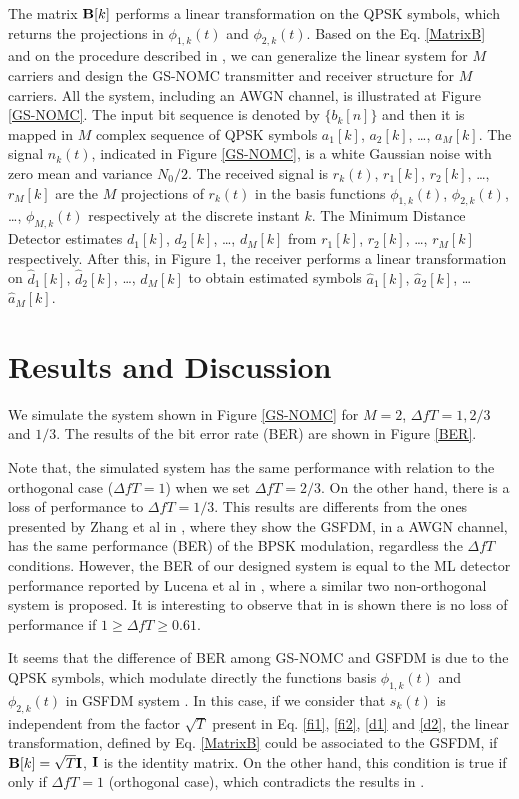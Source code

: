 \documentclass[draftcls,12pt, onecolumn, twoside]{IEEEtran}
\begin{document}
The matrix $\bold{B}[k]$ performs a linear transformation on the QPSK symbols, which returns the projections in $\phi_{1,k}(t)$ and $\phi_{2,k}(t)$. Based on the Eq. \ref{MatrixB} and on the procedure described in \cite{Zhang}, we can generalize the linear system for $M$ carriers and design the GS-NOMC transmitter and receiver structure for $M$ carriers. All the system, including an AWGN channel, is illustrated at Figure \ref{GS-NOMC}. The input bit sequence is denoted by $\{b_k[n]\}$ and then it is mapped in $M$ complex sequence of QPSK symbols $a_1[k]$, $a_2[k]$, \ldots, $a_M[k]$. The signal $n_k(t)$, indicated in Figure \ref{GS-NOMC}, is a white Gaussian noise with zero mean and variance $N_0/2$. The received signal is $r_k(t)$, $r_1[k]$, $r_2[k]$, \ldots, $r_M[k]$ are the $M$ projections of $r_k(t)$ in the basis functions $\phi_{1,k}(t)$, $\phi_{2,k}(t)$, \ldots, $\phi_{M,k}(t)$ respectively at the discrete instant $k$. The Minimum Distance Detector estimates $d_1[k]$, $d_2[k]$, \ldots, $d_M[k]$ from $r_1[k]$, $r_2[k]$, \ldots, $r_M[k]$ respectively. After this, in Figure 1, the receiver performs a linear transformation on $\hat{d}_1[k]$, $\hat{d}_2[k]$, \ldots, $\hat{d}_M[k]$  to obtain estimated symbols $\hat{a}_1[k]$, $\hat{a}_2[k]$, \ldots $\hat{a}_M[k]$.
\vspace{-0.11in}
\section{Results and Discussion}
We simulate the system shown in Figure \ref{GS-NOMC} for $M=2$, $\Delta fT=1, 2/3$ and $1/3$. The results of the bit error rate (BER) are shown in Figure \ref{BER}.

Note that, the simulated system has the same performance with relation to the orthogonal case ($\Delta fT=1$) when we set $\Delta fT=2/3$. On the other hand, there is a loss of performance to $\Delta fT=1/3$. This results are differents from the ones presented by Zhang et al in \cite{Zhang}, where they show the GSFDM, in a AWGN channel, has the same performance (BER) of the BPSK modulation, regardless the $\Delta fT$ conditions. However, the BER of our designed system is equal to the ML detector performance reported by Lucena et al in \cite{Lucena}, where a similar two non-orthogonal system is proposed. It is interesting to observe that in \cite{Lucena} is shown there is no loss of performance if $1\geq \Delta fT \geq 0.61$.

It seems that the difference of BER among GS-NOMC and GSFDM is due to the QPSK symbols, which modulate directly the functions basis $\phi_{1,k}(t)$ and $\phi_{2,k}(t)$ in GSFDM system \cite{Zhang}. In this case, if we consider that $s_k(t)$ is independent from the factor $\sqrt{T}$ present in Eq. \ref{fi1}, \ref{fi2}, \ref{d1} and \ref{d2}, the linear transformation, defined by Eq. \ref{MatrixB} could be associated to the GSFDM, if $\bold{B}[k]=\sqrt{T}\bold{I}$,  $\bold{I}$ is the identity matrix. On the other hand, this condition is true if only if $\Delta fT=1$ (orthogonal case), which contradicts the results in \cite{Zhang}. 
\end{document}
